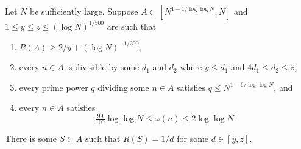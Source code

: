 \begin{proposition}\label{prop:techmain}
\leanok
{}
Let $N$ be sufficiently large. Suppose $A\subset [N^{1-1/\log\log N},N]$ and $1\leq y\leq z\leq (\log N)^{1/500}$ are such that
\begin{enumerate}
\item $R(A)\geq 2/y+(\log N)^{-1/200}$,
\item every $n\in A$ is divisible by some $d_1$ and $d_2$ where $y\leq d_1$ and $4d_1\leq d_2\leq z$,
\item every prime power $q$ dividing some $n\in A$ satisfies $q\leq N^{1-6/\log\log N}$, and
\item every $n\in A$ satisfies
\[\tfrac{99}{100}\log\log N\leq \omega(n) \leq 2\log\log N.\]
\end{enumerate}
There is some $S\subset A$ such that $R(S)=1/d$ for some $d\in [y,z]$.
\end{proposition}
